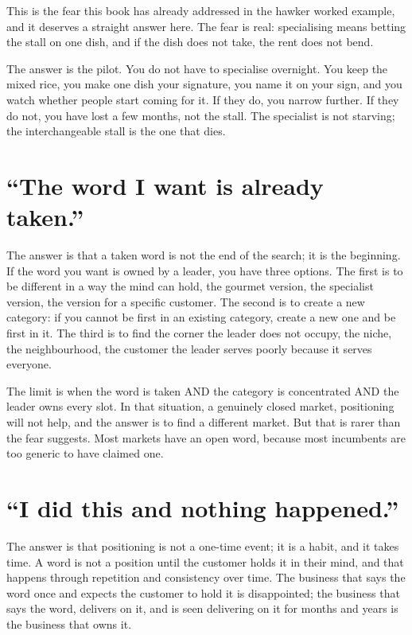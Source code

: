 \documentclass[10pt,twoside,openany]{memoir}
\newcommand{\needspacehead}{\needspace{4\baselineskip}}
\let\oldsection\section
\renewcommand{\section}{\needspacehead\oldsection}
\begin{document}
{{This is the fear this book has already addressed in the hawker worked
example, and it deserves a straight answer here. The fear is real:
specialising means betting the stall on one dish, and if the dish does
not take, the rent does not bend.

The answer is the pilot. You do not have to specialise overnight. You
keep the mixed rice, you make one dish your signature, you name it on
your sign, and you watch whether people start coming for it. If they do,
you narrow further. If they do not, you have lost a few months, not the
stall. The specialist is not starving; the interchangeable stall is the
one that dies.

\section{``The word I want is already
taken.''}\label{the-word-i-want-is-already-taken.}

The answer is that a taken word is not the end of the search; it is the
beginning. If the word you want is owned by a leader, you have three
options. The first is to be different in a way the mind can hold, the
gourmet version, the specialist version, the version for a specific
customer. The second is to create a new category: if you cannot be first
in an existing category, create a new one and be first in it. The third
is to find the corner the leader does not occupy, the niche, the
neighbourhood, the customer the leader serves poorly because it serves
everyone.

The limit is when the word is taken AND the category is concentrated AND
the leader owns every slot. In that situation, a genuinely closed
market, positioning will not help, and the answer is to find a different
market. But that is rarer than the fear suggests. Most markets have an
open word, because most incumbents are too generic to have claimed one.

\section{``I did this and nothing
happened.''}\label{i-did-this-and-nothing-happened.}

The answer is that positioning is not a one-time event; it is a habit,
and it takes time. A word is not a position until the customer holds it
in their mind, and that happens through repetition and consistency over
time. The business that says the word once and expects the customer to
hold it is disappointed; the business that says the word, delivers on
it, and is seen delivering on it for months and years is the business
that owns it.

}}
\end{document}
